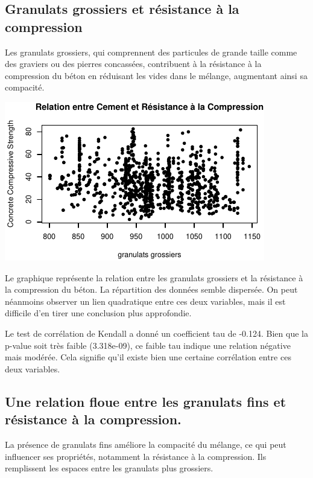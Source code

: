 \documentclass[
  12pt,
]{article}
\begin{document}
\subsection{Granulats grossiers et résistance à la
compression}\label{granulats-grossiers-et-ruxe9sistance-uxe0-la-compression}

Les granulats grossiers, qui comprennent des particules de grande taille
comme des graviers ou des pierres concassées, contribuent à la
résistance à la compression du béton en réduisant les vides dans le
mélange, augmentant ainsi sa compacité.

\begin{center}\includegraphics{rmd_final_files/figure-latex/unnamed-chunk-21-1} \end{center}

Le graphique représente la relation entre les granulats grossiers et la
résistance à la compression du béton. La répartition des données semble
dispersée. On peut néanmoins observer un lien quadratique entre ces deux
variables, mais il est difficile d'en tirer une conclusion plus
approfondie.

Le test de corrélation de Kendall a donné un coefficient tau de -0.124.
Bien que la p-value soit très faible (3.318e-09), ce faible tau indique
une relation négative mais modérée. Cela signifie qu'il existe bien une
certaine corrélation entre ces deux variables.

\subsection{Une relation floue entre les granulats fins et résistance à
la
compression.}\label{une-relation-floue-entre-les-granulats-fins-et-ruxe9sistance-uxe0-la-compression.}

La présence de granulats fins améliore la compacité du mélange, ce qui
peut influencer ses propriétés, notamment la résistance à la
compression. Ils remplissent les espaces entre les granulats plus
grossiers.
\end{document}
